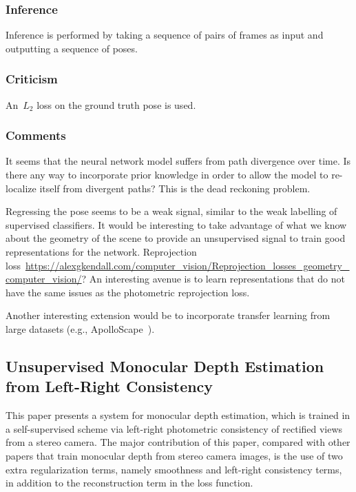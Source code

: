 \documentclass[a4paper, 12pt]{article}
\begin{document}
\subsubsection{Inference}

Inference is performed by taking a sequence of pairs of frames as input and
outputting a sequence of poses.


\subsubsection{Criticism}

An~$L_2$ loss on the ground truth pose is used.


\subsubsection{Comments}

It seems that the neural network model suffers from path divergence over time.
Is there any way to incorporate prior knowledge in order to allow the model to
re-localize itself from divergent paths? This is the dead reckoning problem.

Regressing the pose seems to be a weak signal, similar to the weak labelling of
supervised classifiers. It would be interesting to take advantage of what we
know about the geometry of the scene to provide an unsupervised signal to train
good representations for the network. Reprojection
loss~\url{https://alexgkendall.com/computer_vision/Reprojection_losses_geometry_computer_vision/}?
An interesting avenue is to learn representations that do not have the same
issues as the photometric reprojection loss.

Another interesting extension would be to incorporate transfer learning from
large datasets (e.g., ApolloScape~\citet{huang-apolloscape-2018}).


\subsection{Unsupervised Monocular Depth Estimation from Left-Right
            Consistency~\citet{monodepth17}}

This paper presents a system for monocular depth estimation, which is trained
in a self-supervised scheme via left-right photometric consistency of rectified
views from a stereo camera. The major contribution of this paper, compared with
other papers that train monocular depth from stereo camera images, is the use
of two extra regularization terms, namely smoothness and left-right consistency
terms, in addition to the reconstruction term in the loss function.
\end{document}
